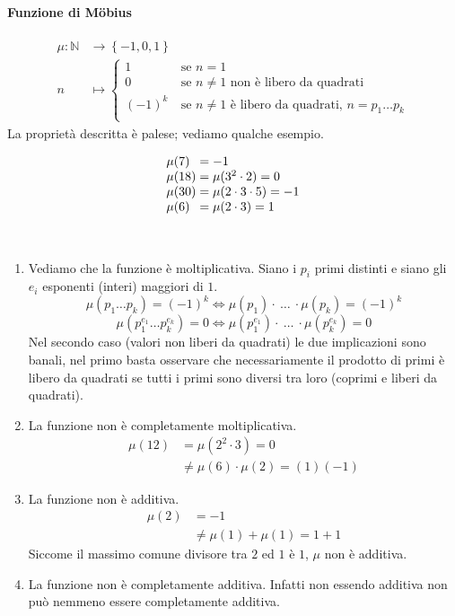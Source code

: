 \paragraph{Funzione di M\"obius}
\begin{align*}
\mu: \mathbb{N}&\longrightarrow \left\{-1,0,1\right\}\\
n &\longmapsto 
\begin{cases}
1 \  & \text{se $n=1$}\\
0 \  & \text{se $n\neq1$ non è libero da quadrati}\\
(-1)^k \  & \text{se $n\neq1$ è libero da quadrati, $n=p_1\dots p_k$}\\
\end{cases}
\end{align*}
La proprietà descritta è palese; vediamo qualche esempio.
\begin{esempio}
	\begin{equation*}
	\arraycolsep=1.4pt
	\begin{array}{ll}
		\mu(7)&=-1	\\ 
		\mu(18)&=\mu(3^2\cdot2)=0\\
		\mu(30)& =\mu(2\cdot3\cdot5)=-1\\
		\mu(6) &=\mu(2\cdot3)=1
	\end{array}
	\end{equation*}
\end{esempio}
\begin{osservazione}[Proprietà] \
	\begin{enumerate}
		\item Vediamo che la funzione è moltiplicativa. Siano i $p_i$ primi distinti e siano gli $e_i$ esponenti (interi) maggiori di $1$.
		\begin{equation*}
		\mu(p_1\dots p_k)=(-1)^k \iff \mu(p_1)\cdot \ \dots \ \cdot \mu(p_k)=(-1)^k
		\end{equation*}
		\begin{equation*}
		\mu(p_1^{e_1}\dots p_k^{e_k})=0 \iff \mu(p_1^{e_1})\cdot \ \dots \ \cdot \mu(p_k^{e_k})=0
		\end{equation*}
		Nel secondo caso (valori non liberi da quadrati) le due implicazioni sono banali, nel primo basta osservare che necessariamente il prodotto di primi è libero da quadrati se tutti i primi sono diversi tra loro (coprimi e liberi da quadrati).
		\item La funzione non è completamente moltiplicativa.
		\begin{align*}
		\mu(12)&=\mu(2^2\cdot3)=0\\ &\neq \mu(6)\cdot \mu(2)=(1)(-1)
		\end{align*}
		\item La funzione non è additiva.
		\begin{align*}
		\mu(2)&=-1\\
		&\neq \mu(1)+\mu(1)=1+1
		\end{align*}
		Siccome il massimo comune divisore tra $2$ ed $1$ è $1$, $\mu$ non è additiva.
		\item La funzione non è completamente additiva. Infatti non essendo additiva non può nemmeno essere completamente additiva.
		
	\end{enumerate}
\end{osservazione}
